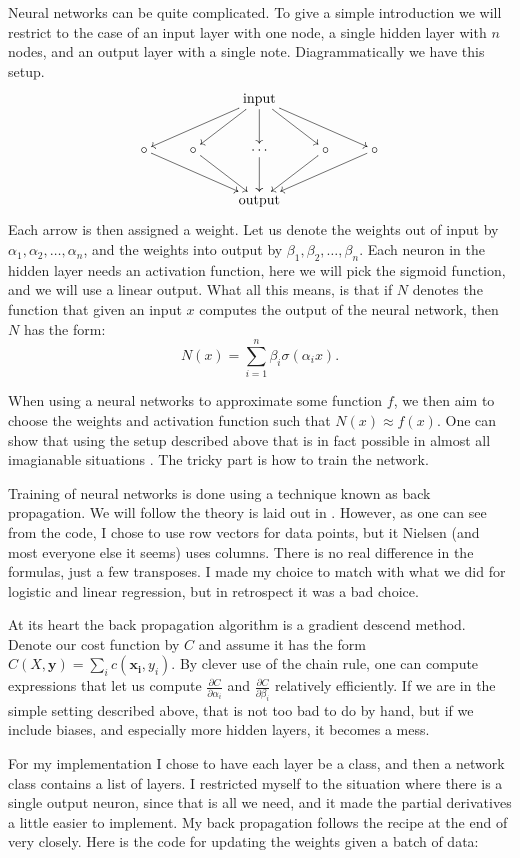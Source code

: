 \documentclass[parskip=half]{scrartcl}
\theoremstyle{definition}
\theoremstyle{remark}
\newcommand{\vect}[1]{{\bm{#1}}}
\begin{document}
Neural networks can be quite complicated. 
To give a simple introduction we will restrict to the case of an input layer with one node, a single hidden layer with $n$ nodes, and an output layer with a single note.
Diagrammatically we have this setup.
\[
	\xymatrix{
		& & \text{input} \ar[drr] \ar[dr] \ar[d] \ar[dl] \ar[dll] & &  \\
		\circ \ar[drr] & \circ \ar[dr] & \cdots \ar[d] & \circ \ar[dl] & \circ \ar[dll] \\
		& & \text{output} & & 
	}
\]
Each arrow is then assigned a weight. 
Let us denote the weights out of input by $\alpha_1, \alpha_2, \ldots, \alpha_n$, and the weights into output by $\beta_1, \beta_2, \ldots, \beta_n$. 
Each neuron in the hidden layer needs an activation function, here we will pick the sigmoid function, and we will use a linear output.
What all this means, is that if $N$ denotes the function that given an input $x$ computes the output of the neural network, then $N$ has the form:
\[
	N(x) =  \sum_{i=1}^n \beta_i \sigma(\alpha_i x).
\]  
 
When using a neural networks to approximate some function $f$, we then aim to choose the weights and activation function such that $N(x) \approx f(x)$. 
One can show that using the setup described above that is in fact possible in almost all imagianable situations \cite{Hornik}.  
The tricky part is how to train the network. 

Training of neural networks is done using a technique known as back propagation.
We will follow the theory is laid out in \cite[Chapter 2]{Nielsen}. 
However, as one can see from the code, I chose to use row vectors for data points, but it Nielsen (and most everyone else it seems) uses columns. 
There is no real difference in the formulas, just a few transposes. 
I made my choice to match with what we did for logistic and linear regression, but in retrospect it was a bad choice. 

At its heart the back propagation algorithm is a gradient descend method. 
Denote our cost function by $C$ and assume it has the form $C(X, \vect{y}) = \sum_{i} c(\vect{x_i}, y_i)$. By clever use of the chain rule, one can compute expressions that let us compute $\frac{\partial C}{\partial \alpha_i}$ and $\frac{\partial C}{\partial \beta_i}$ relatively efficiently. 
If we are in the simple setting described above, that is not too bad to do by hand, but if we include biases, and especially more hidden layers, it becomes a mess.

For my implementation I chose to have each layer be a class, and then a network class contains a list of layers. 
I restricted myself to the situation where there is a single output neuron, since that is all we need, and it made the partial derivatives a little easier to implement. 
My back propagation follows the recipe at the end of \cite[Chapter 2]{Nielsen} very closely.
Here is the code for updating the weights given a batch of data:
\end{document}
